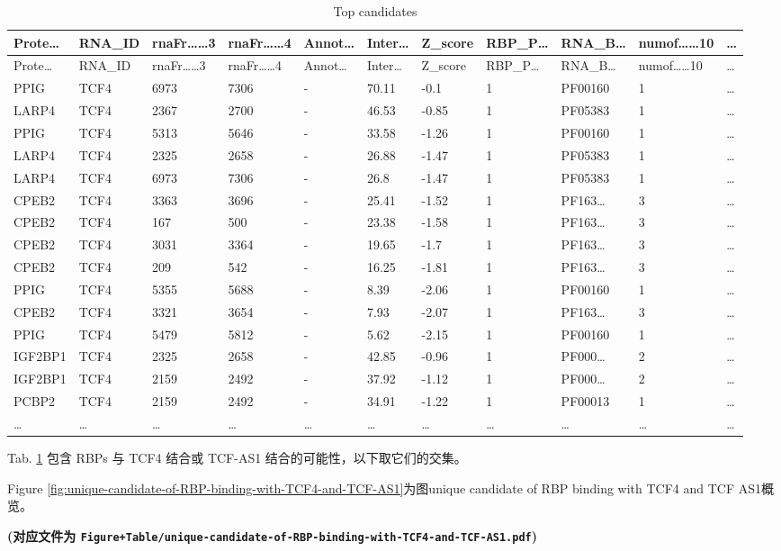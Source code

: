\documentclass[
]{article}
\begin{document}
\begin{longtable}[]{@{}lllllllllll@{}}
\caption{\label{tab:top-candidates}Top candidates}\tabularnewline
\toprule
Prote\ldots{} & RNA\_ID & rnaFr\ldots\ldots3 & rnaFr\ldots\ldots4 & Annot\ldots{} & Inter\ldots{} & Z\_score & RBP\_P\ldots{} & RNA\_B\ldots{} & numof\ldots\ldots10 & \ldots{}\tabularnewline
\midrule
\endfirsthead
\toprule
Prote\ldots{} & RNA\_ID & rnaFr\ldots\ldots3 & rnaFr\ldots\ldots4 & Annot\ldots{} & Inter\ldots{} & Z\_score & RBP\_P\ldots{} & RNA\_B\ldots{} & numof\ldots\ldots10 & \ldots{}\tabularnewline
\midrule
\endhead
PPIG & TCF4 & 6973 & 7306 & - & 70.11 & -0.1 & 1 & PF00160 & 1 & \ldots{}\tabularnewline
LARP4 & TCF4 & 2367 & 2700 & - & 46.53 & -0.85 & 1 & PF05383 & 1 & \ldots{}\tabularnewline
PPIG & TCF4 & 5313 & 5646 & - & 33.58 & -1.26 & 1 & PF00160 & 1 & \ldots{}\tabularnewline
LARP4 & TCF4 & 2325 & 2658 & - & 26.88 & -1.47 & 1 & PF05383 & 1 & \ldots{}\tabularnewline
LARP4 & TCF4 & 6973 & 7306 & - & 26.8 & -1.47 & 1 & PF05383 & 1 & \ldots{}\tabularnewline
CPEB2 & TCF4 & 3363 & 3696 & - & 25.41 & -1.52 & 1 & PF163\ldots{} & 3 & \ldots{}\tabularnewline
CPEB2 & TCF4 & 167 & 500 & - & 23.38 & -1.58 & 1 & PF163\ldots{} & 3 & \ldots{}\tabularnewline
CPEB2 & TCF4 & 3031 & 3364 & - & 19.65 & -1.7 & 1 & PF163\ldots{} & 3 & \ldots{}\tabularnewline
CPEB2 & TCF4 & 209 & 542 & - & 16.25 & -1.81 & 1 & PF163\ldots{} & 3 & \ldots{}\tabularnewline
PPIG & TCF4 & 5355 & 5688 & - & 8.39 & -2.06 & 1 & PF00160 & 1 & \ldots{}\tabularnewline
CPEB2 & TCF4 & 3321 & 3654 & - & 7.93 & -2.07 & 1 & PF163\ldots{} & 3 & \ldots{}\tabularnewline
PPIG & TCF4 & 5479 & 5812 & - & 5.62 & -2.15 & 1 & PF00160 & 1 & \ldots{}\tabularnewline
IGF2BP1 & TCF4 & 2325 & 2658 & - & 42.85 & -0.96 & 1 & PF000\ldots{} & 2 & \ldots{}\tabularnewline
IGF2BP1 & TCF4 & 2159 & 2492 & - & 37.92 & -1.12 & 1 & PF000\ldots{} & 2 & \ldots{}\tabularnewline
PCBP2 & TCF4 & 2159 & 2492 & - & 34.91 & -1.22 & 1 & PF00013 & 1 & \ldots{}\tabularnewline
\ldots{} & \ldots{} & \ldots{} & \ldots{} & \ldots{} & \ldots{} & \ldots{} & \ldots{} & \ldots{} & \ldots{} & \ldots{}\tabularnewline
\bottomrule
\end{longtable}

Tab. \ref{tab:top-candidates} 包含 RBPs 与 TCF4 结合或 TCF-AS1 结合的可能性，以下取它们的交集。

Figure \ref{fig:unique-candidate-of-RBP-binding-with-TCF4-and-TCF-AS1}为图unique candidate of RBP binding with TCF4 and TCF AS1概览。

\textbf{(对应文件为 \texttt{Figure+Table/unique-candidate-of-RBP-binding-with-TCF4-and-TCF-AS1.pdf})}
\end{document}

